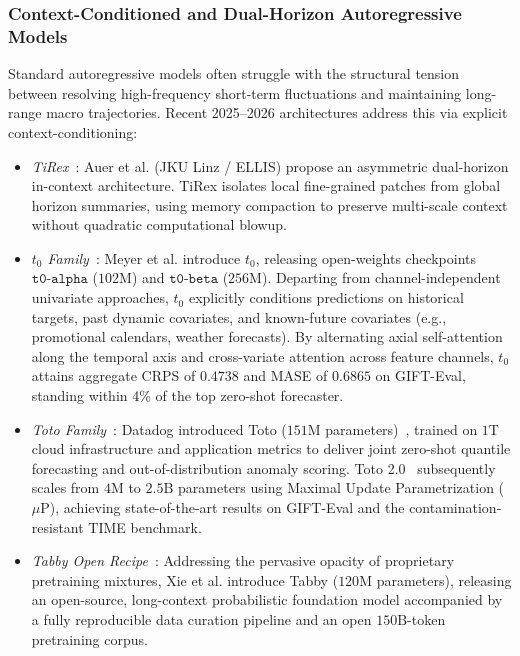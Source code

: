 \subsubsection{Context-Conditioned and Dual-Horizon Autoregressive Models}
Standard autoregressive models often struggle with the structural tension between resolving high-frequency short-term fluctuations and maintaining long-range macro trajectories. Recent 2025--2026 architectures address this via explicit context-conditioning:
\begin{itemize}[leftmargin=*]
    \item \emph{TiRex}~\cite{auer2025tirex}: Auer et al. (JKU Linz / ELLIS) propose an asymmetric dual-horizon in-context architecture. TiRex isolates local fine-grained patches from global horizon summaries, using memory compaction to preserve multi-scale context without quadratic computational blowup.
    \item \emph{$t_0$ Family}~\cite{meyer2026t0}: Meyer et al. introduce $t_0$, releasing open-weights checkpoints $\texttt{t0-alpha}$ ($102\text{M}$) and $\texttt{t0-beta}$ ($256\text{M}$). Departing from channel-independent univariate approaches, $t_0$ explicitly conditions predictions on historical targets, past dynamic covariates, and known-future covariates (e.g., promotional calendars, weather forecasts). By alternating axial self-attention along the temporal axis and cross-variate attention across feature channels, $t_0$ attains aggregate CRPS of $0.4738$ and MASE of $0.6865$ on GIFT-Eval, standing within 4\% of the top zero-shot forecaster.
    \item \emph{Toto Family}~\cite{cohen2025toto,datadog2026toto2}: Datadog introduced Toto ($151\text{M}$ parameters)~\cite{cohen2025toto}, trained on $1\text{T}$ cloud infrastructure and application metrics to deliver joint zero-shot quantile forecasting and out-of-distribution anomaly scoring. Toto 2.0~\cite{datadog2026toto2} subsequently scales from $4\text{M}$ to $2.5\text{B}$ parameters using Maximal Update Parametrization ($\mu\text{P}$), achieving state-of-the-art results on GIFT-Eval and the contamination-resistant TIME benchmark.
    \item \emph{Tabby Open Recipe}~\cite{xie2026tabby}: Addressing the pervasive opacity of proprietary pretraining mixtures, Xie et al. introduce Tabby ($120\text{M}$ parameters), releasing an open-source, long-context probabilistic foundation model accompanied by a fully reproducible data curation pipeline and an open $150\text{B}$-token pretraining corpus.
\end{itemize}

